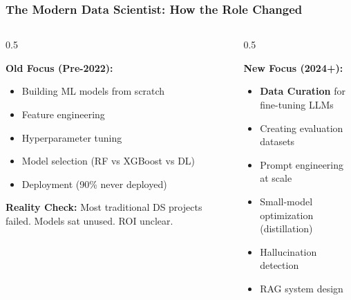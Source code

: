 \begin{frame}[fragile]\frametitle{The Modern Data Scientist: How the Role Changed}

\begin{columns}
\begin{column}[T]{0.5\linewidth}

\textbf{Old Focus (Pre-2022):}
\begin{itemize}
\item Building ML models from scratch
\item Feature engineering
\item Hyperparameter tuning
\item Model selection (RF vs XGBoost vs DL)
\item Deployment (90\% never deployed)
\end{itemize}

\textbf{Reality Check:}
Most traditional DS projects failed. Models sat unused. ROI unclear.

\end{column}
\begin{column}[T]{0.5\linewidth}

\textbf{New Focus (2024+):}
\begin{itemize}
\item \textbf{Data Curation} for fine-tuning LLMs
\item Creating evaluation datasets
\item Prompt engineering at scale
\item Small-model optimization (distillation)
\item Hallucination detection
\item RAG system design
\end{itemize}


\end{column}
\end{columns}



\end{frame}
